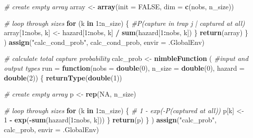 \documentclass[
]{article}
\newenvironment{Shaded}{\begin{snugshade}}{\end{snugshade}}
\newcommand{\AttributeTok}[1]{\textcolor[rgb]{0.13,0.29,0.53}{#1}}
\newcommand{\CommentTok}[1]{\textcolor[rgb]{0.56,0.35,0.01}{\textit{#1}}}
\newcommand{\ConstantTok}[1]{\textcolor[rgb]{0.56,0.35,0.01}{#1}}
\newcommand{\ControlFlowTok}[1]{\textcolor[rgb]{0.13,0.29,0.53}{\textbf{#1}}}
\newcommand{\DecValTok}[1]{\textcolor[rgb]{0.00,0.00,0.81}{#1}}
\newcommand{\FunctionTok}[1]{\textcolor[rgb]{0.13,0.29,0.53}{\textbf{#1}}}
\newcommand{\NormalTok}[1]{#1}
\newcommand{\OtherTok}[1]{\textcolor[rgb]{0.56,0.35,0.01}{#1}}
\newcommand{\SpecialCharTok}[1]{\textcolor[rgb]{0.81,0.36,0.00}{\textbf{#1}}}
\newcommand{\StringTok}[1]{\textcolor[rgb]{0.31,0.60,0.02}{#1}}
\begin{document}
\begin{Shaded}
\begin{Highlighting}[]
      \CommentTok{\# create empty array}
\NormalTok{      array }\OtherTok{\textless{}{-}} \FunctionTok{array}\NormalTok{(}\AttributeTok{init =} \ConstantTok{FALSE}\NormalTok{, }\AttributeTok{dim =} \FunctionTok{c}\NormalTok{(nobs, n\_size))}
      
      \CommentTok{\# loop through sizes}
      \ControlFlowTok{for}\NormalTok{ (k }\ControlFlowTok{in} \DecValTok{1}\SpecialCharTok{:}\NormalTok{n\_size) \{}
        \CommentTok{\#P(capture in trap j | captured at all)}
\NormalTok{        array[}\DecValTok{1}\SpecialCharTok{:}\NormalTok{nobs, k] }\OtherTok{\textless{}{-}}\NormalTok{ hazard[}\DecValTok{1}\SpecialCharTok{:}\NormalTok{nobs, k] }\SpecialCharTok{/} \FunctionTok{sum}\NormalTok{(hazard[}\DecValTok{1}\SpecialCharTok{:}\NormalTok{nobs, k])}
\NormalTok{      \}}
      \FunctionTok{return}\NormalTok{(array)}
\NormalTok{    \}}
\NormalTok{  )}
  \FunctionTok{assign}\NormalTok{(}\StringTok{"calc\_cond\_prob"}\NormalTok{, calc\_cond\_prob, }\AttributeTok{envir =}\NormalTok{ .GlobalEnv)}
  
  
  \CommentTok{\# calculate total capture probability}
\NormalTok{  calc\_prob }\OtherTok{\textless{}{-}} \FunctionTok{nimbleFunction}\NormalTok{ (}
    \CommentTok{\#input and output types}
    \AttributeTok{run =} \ControlFlowTok{function}\NormalTok{(}\AttributeTok{nobs =} \FunctionTok{double}\NormalTok{(}\DecValTok{0}\NormalTok{), }\AttributeTok{n\_size =} \FunctionTok{double}\NormalTok{(}\DecValTok{0}\NormalTok{), }\AttributeTok{hazard =} \FunctionTok{double}\NormalTok{(}\DecValTok{2}\NormalTok{))}
\NormalTok{    \{}
      \FunctionTok{returnType}\NormalTok{(}\FunctionTok{double}\NormalTok{(}\DecValTok{1}\NormalTok{))}
      
      \CommentTok{\# create empty array}
\NormalTok{      p }\OtherTok{\textless{}{-}} \FunctionTok{rep}\NormalTok{(}\ConstantTok{NA}\NormalTok{, n\_size)}
      
      \CommentTok{\# loop through sizes}
      \ControlFlowTok{for}\NormalTok{ (k }\ControlFlowTok{in} \DecValTok{1}\SpecialCharTok{:}\NormalTok{n\_size) \{}
        \CommentTok{\# 1 {-} exp({-}P(captured at all))}
\NormalTok{        p[k] }\OtherTok{\textless{}{-}} \DecValTok{1} \SpecialCharTok{{-}} \FunctionTok{exp}\NormalTok{(}\SpecialCharTok{{-}}\FunctionTok{sum}\NormalTok{(hazard[}\DecValTok{1}\SpecialCharTok{:}\NormalTok{nobs, k]))}
\NormalTok{      \}}
      \FunctionTok{return}\NormalTok{(p)}
\NormalTok{    \}}
\NormalTok{  )}
  \FunctionTok{assign}\NormalTok{(}\StringTok{"calc\_prob"}\NormalTok{, calc\_prob, }\AttributeTok{envir =}\NormalTok{ .GlobalEnv)}
  

\end{Highlighting}
\end{Shaded}
\end{document}

